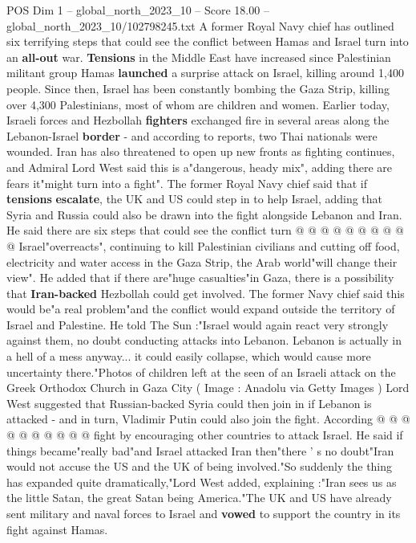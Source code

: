 \begin{textsample}{POS Dim 1 – global\_north\_2023\_10 – Score 18.00 – global\_north\_2023\_10/102798245.txt}  \label{ex:f1_pos_147}
A former Royal Navy chief has outlined six terrifying steps that could see the conflict between Hamas and Israel turn into an \textbf{all-out} war. \textbf{Tensions} in the Middle East have increased since Palestinian militant group Hamas \textbf{launched} a surprise attack on Israel, killing around 1,400 people.
Since then, Israel has been constantly bombing the Gaza Strip, killing over 4,300 Palestinians, most of whom are children and women.
Earlier today, Israeli forces and Hezbollah \textbf{fighters} exchanged fire in several areas along the Lebanon-Israel \textbf{border} - and according to reports, two Thai nationals were wounded.
Iran has also threatened to open up new fronts as fighting continues, and Admiral Lord West said this is a"dangerous, heady mix", adding there are fears it"might turn into a fight".
The former Royal Navy chief said that if \textbf{tensions} \textbf{escalate}, the UK and US could step in to help Israel, adding that Syria and Russia could also be drawn into the fight alongside Lebanon and Iran.
He said there are six steps that could see the conflict turn @ @ @ @ @ @ @ @ @ @ Israel"overreacts", continuing to kill Palestinian civilians and cutting off food, electricity and water access in the Gaza Strip, the Arab world"will change their view".
He added that if there are"huge casualties"in Gaza, there is a possibility that \textbf{Iran-backed} Hezbollah could get involved.
The former Navy chief said this would be"a real problem"and the conflict would expand outside the territory of Israel and Palestine.
He told The Sun :"Israel would again react very strongly against them, no doubt conducting attacks into Lebanon.
Lebanon is actually in a hell of a mess anyway... it could easily collapse, which would cause more uncertainty there."Photos of children left at the seen of an Israeli attack on the Greek Orthodox Church in Gaza City ( Image : Anadolu via Getty Images ) Lord West suggested that Russian-backed Syria could then join in if Lebanon is attacked - and in turn, Vladimir Putin could also join the fight.
According @ @ @ @ @ @ @ @ @ @ fight by encouraging other countries to attack Israel.
He said if things became"really bad"and Israel attacked Iran then"there ' s no doubt"Iran would not accuse the US and the UK of being involved."So suddenly the thing has expanded quite dramatically,"Lord West added, explaining :"Iran sees us as the little Satan, the great Satan being America."The UK and US have already sent military and naval forces to Israel and \textbf{vowed} to support the country in its fight against Hamas.

\end{textsample}
